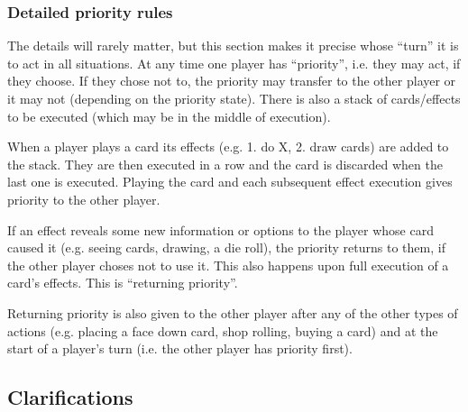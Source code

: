 \documentclass[dvipsnames,parskip,a4paper]{scrartcl}
\begin{document}
\subsubsection*{Detailed priority rules}

The details will rarely matter, but this section makes it precise whose ``turn'' it is to act in all situations. At any time one player has ``priority'', i.e. they may act, if they choose. If they chose not to, the priority may transfer to the other player or it may not (depending on the priority state). There is also a stack of cards/effects to be executed (which may be in the middle of execution).

When a player plays a card its effects (e.g. 1. do X, 2. draw cards) are added to the stack. They are then executed in a row and the card is discarded when the last one is executed. Playing the card and each subsequent effect execution gives priority to the other player.

If an effect reveals some new information or options to the player whose card caused it (e.g. seeing cards, drawing, a die roll), the priority returns to them, if the other player choses not to use it. This also happens upon full execution of a card's effects. This is ``returning priority''.

Returning priority is also given to the other player after any of the other types of actions (e.g. placing a face down card, shop rolling, buying a card) and at the start of a player's turn (i.e. the other player has priority first).

\newpage

\subsection*{Clarifications}
\end{document}
